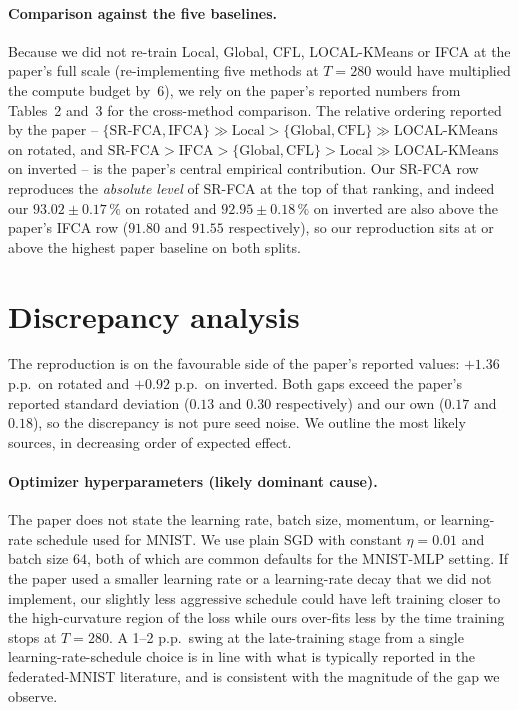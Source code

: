 \paragraph{Comparison against the five baselines.} Because we did not re-train Local, Global, CFL, LOCAL-KMeans or IFCA at the paper's full scale (re-implementing five methods at $T = 280$ would have multiplied the compute budget by~$6$), we rely on the paper's reported numbers from Tables~2 and~3 for the cross-method comparison. The relative ordering reported by the paper -- $\{\text{SR-FCA}, \text{IFCA}\} \gg \text{Local} > \{\text{Global}, \text{CFL}\} \gg \text{LOCAL-KMeans}$ on rotated, and $\text{SR-FCA} > \text{IFCA} > \{\text{Global}, \text{CFL}\} > \text{Local} \gg \text{LOCAL-KMeans}$ on inverted -- is the paper's central empirical contribution. Our SR-FCA row reproduces the \emph{absolute level} of SR-FCA at the top of that ranking, and indeed our $93.02 \pm 0.17\,\%$ on rotated and $92.95 \pm 0.18\,\%$ on inverted are also above the paper's IFCA row ($91.80$ and $91.55$ respectively), so our reproduction sits at or above the highest paper baseline on both splits.

\section{Discrepancy analysis}\label{sec:discrepancy}

The reproduction is on the favourable side of the paper's reported values: $+1.36$ p.p.\ on rotated and $+0.92$ p.p.\ on inverted. Both gaps exceed the paper's reported standard deviation ($0.13$ and $0.30$ respectively) and our own ($0.17$ and $0.18$), so the discrepancy is not pure seed noise. We outline the most likely sources, in decreasing order of expected effect.

\paragraph{Optimizer hyperparameters (likely dominant cause).} The paper does not state the learning rate, batch size, momentum, or learning-rate schedule used for MNIST. We use plain SGD with constant $\eta = 0.01$ and batch size $64$, both of which are common defaults for the MNIST-MLP setting. If the paper used a smaller learning rate or a learning-rate decay that we did not implement, our slightly less aggressive schedule could have left training closer to the high-curvature region of the loss while ours over-fits less by the time training stops at $T = 280$. A 1--2 p.p.\ swing at the late-training stage from a single learning-rate-schedule choice is in line with what is typically reported in the federated-MNIST literature, and is consistent with the magnitude of the gap we observe.

